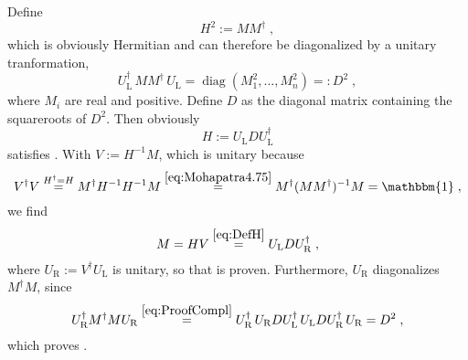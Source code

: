 \documentclass[12pt,a4paper,twoside]{scrartcl}
\DeclareMathOperator{\diag}{diag}
\numberwithin{equation}{section}
\numberwithin{table}{section}
\begin{document}
\begin{Proof}
 Define
 \begin{equation}\label{eq:Mohapatra4.75}
        H^2 := M M^\dagger \;,
 \end{equation}
 which is obviously Hermitian and can therefore be diagonalized by a
 unitary tranformation,
 \begin{equation}
        U_\mathrm{L}^\dagger \, M M^\dagger \, U_\mathrm{L} =
         \diag(M_1^2,\dots,M_n^2) =: D^2 \;,
 \end{equation}
 where $M_i$ are real and positive.
 Define $D$ as the diagonal matrix containing the squareroots of $D^2$.
 Then obviously
 \begin{equation} \label{eq:DefH}
        H := U_\mathrm{L} D U_\mathrm{L}^\dagger 
 \end{equation}
 satisfies . With $V:=H^{-1}M$, 
 which is unitary because
 \begin{equation}
        V^\dagger V \stackrel{H^\dagger=H}{=}
        M^\dagger H^{-1} H^{-1} M \stackrel{\eqref{eq:Mohapatra4.75}}{=}
        M^\dagger (M M^\dagger)^{-1} M = \mathbbm{1} \;,
 \end{equation}
 we find
 \begin{equation} \label{eq:ProofCompl}
        M = H V \stackrel{\eqref{eq:DefH}}{=}
        U_\mathrm{L} D U_\mathrm{R}^\dagger \;,
 \end{equation}
 where $U_\mathrm{R} := V^\dagger U_\mathrm{L}$ is unitary, so that
  is proven. Furthermore, $U_\mathrm{R}$
 diagonalizes $M^\dagger M$, since
 \begin{equation}
        U_\mathrm{R}^\dagger M^\dagger M U_\mathrm{R}
        \stackrel{\eqref{eq:ProofCompl}}{=}
        U_\mathrm{R}^\dagger \, U_\mathrm{R} D U_\mathrm{L}^\dagger \,
         U_\mathrm{L} D U_\mathrm{R}^\dagger \, U_\mathrm{R} = D^2 \;,
 \end{equation}
 which proves .
\end{Proof}
\end{document}
